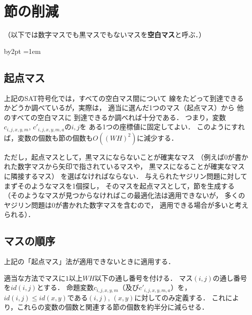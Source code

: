 \documentclass[a4j]{jarticle}
\newcommand{\←}{{\leftarrow}}
\newcommand{\→}{{\rightarrow}}
\newcommand{\↑}{{\uparrow}}
\newcommand{\↓}{{\downarrow}}
\begin{document}
\section{節の削減}


（以下では数字マスでも黒マスでもないマスを\textbf{空白マス}と呼ぶ．）

\newcommand{\id}{\mathit{id}}
\advance\parskip by2pt
\parindent=1em

\subsection{起点マス}

上記のSAT符号化では，すべての空白マス間について
線をたどって到達できるかどうか調べているが，実際は，
適当に選んだ1つのマス（起点マス）から
他のすべての空白マスに
到達できるか調べれば十分である．
つまり，変数$c_{i,j,x,y,m}$, $c'_{i,j,x,y,m,a}$の$i,j$を
ある1つの座標値に固定してよい．
このようにすれば，変数の個数も節の個数も$O((WH)^2)$に減少する．

ただし，起点マスとして，黒マスにならないことが確実なマス
（例えば$0$が書かれた数字マスから矢印で指されているマスや，
黒マスになることが確実なマスに隣接するマス）
を選ばなければならない．
与えられたヤジリン問題に対してまずそのようなマスを1個探し，
そのマスを起点マスとして，節を生成する
（そのようなマスが見つからなければこの最適化法は適用できないが，
多くのヤジリン問題は$0$が書かれた数字マスを含むので，
適用できる場合が多いと考えられる）．

\subsection{マスの順序}

上記の「起点マス」法が適用できないときに適用する．

適当な方法でマスに$1$以上$WH$以下の通し番号を付ける．
マス$(i,j)$の通し番号を$\id(i,j)$とする．
%
命題変数$c_{i,j,x,y,m}$（及び$c'_{i,j,x,y,m,a}$）を，
$\id(i,j)\le\id(x,y)$である$(i,j)$, $(x,y)$に対してのみ定義する．
これにより，これらの変数の個数と関連する節の個数を約半分に減らせる．
\end{document}
